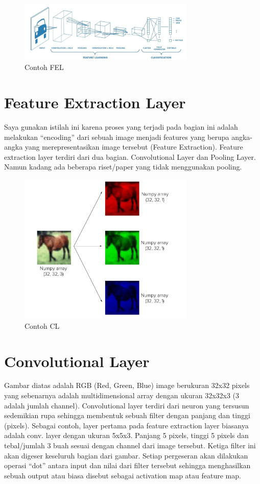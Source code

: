 \begin{figure}[!htp]
	\includegraphics[width=0.75\textwidth]{figures/FeatureExtractionLayer.PNG}
	\caption{Contoh FEL}
	\label{labelgambar}
\end{figure}

\section{Feature Extraction Layer}
Saya gunakan istilah ini karena proses yang terjadi pada bagian ini adalah melakukan “encoding” dari sebuah image menjadi features yang berupa angka-angka yang merepresentasikan image tersebut (Feature Extraction).
Feature extraction layer terdiri dari dua bagian. Convolutional Layer dan Pooling Layer. Namun kadang ada beberapa riset/paper yang tidak menggunakan pooling.

\begin{figure}[!htp]
	\includegraphics[width=0.75\textwidth]{figures/ConvolutionalLayer.PNG}
	\caption{Contoh CL}
	\label{labelgambar}
\end{figure}

\section{Convolutional Layer}
Gambar diatas adalah RGB (Red, Green, Blue) image berukuran 32x32 pixels yang sebenarnya adalah multidimensional array dengan ukuran 32x32x3 (3 adalah jumlah channel).
Convolutional layer terdiri dari neuron yang tersusun sedemikian rupa sehingga membentuk sebuah filter dengan panjang dan tinggi (pixels). Sebagai contoh, layer pertama pada feature extraction layer biasanya adalah conv. layer dengan ukuran 5x5x3. Panjang 5 pixels, tinggi 5 pixels dan tebal/jumlah 3 buah sesuai dengan channel dari image tersebut.
Ketiga filter ini akan digeser keseluruh bagian dari gambar. Setiap pergeseran akan dilakukan operasi “dot” antara input dan nilai dari filter tersebut sehingga menghasilkan sebuah output atau biasa disebut sebagai activation map atau feature map.
 
